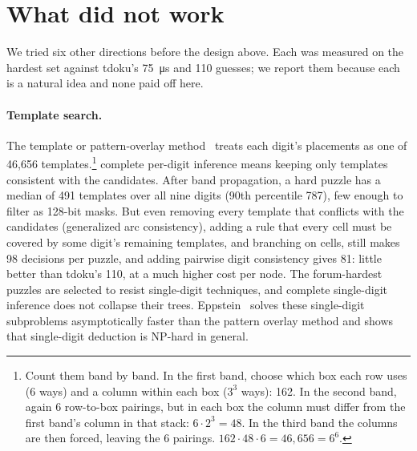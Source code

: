 \documentclass[11pt]{article}
\theoremstyle{definition}
\theoremstyle{plain}
\begin{document}
\section{What did not work}
\label{sec:negative}

We tried six other directions before the design above. Each was measured on the hardest set against tdoku's
\SI{75}{\micro\second} and 110 guesses; we report them because each is a natural idea and none paid off here.

\paragraph{Template search.} The template or pattern-overlay method~\cite{stuart2008pom} treats each digit's placements as one
of 46{,}656 templates.\footnote{Count them band by band. In the first band, choose which box each row uses (6 ways)
and a column within each box ($3^3$ ways): 162. In the second band, again 6 row-to-box pairings, but in each box the
column must differ from the first band's column in that stack: $6\cdot 2^3=48$. In the third band the columns are then
forced, leaving the 6 pairings. $162\cdot 48\cdot 6 = 46{,}656 = 6^6$.} complete per-digit inference means keeping only templates consistent with the candidates. After
band propagation, a hard puzzle has a median of 491 templates over all nine digits (90th percentile 787), few enough
to filter as 128-bit masks. But even removing every template that conflicts with the
candidates (generalized arc consistency), adding a rule that every cell must be covered by some digit's remaining
templates, and branching on cells, still makes 98 decisions per puzzle, and adding pairwise digit consistency gives 81: little
better than tdoku's 110, at a much higher cost per node. The forum-hardest puzzles are selected to resist single-digit techniques, and complete single-digit inference does not
collapse their trees. Eppstein~\cite{eppstein2012single} solves these single-digit subproblems asymptotically faster
than the pattern overlay method and shows that single-digit deduction is NP-hard in general.
\end{document}
